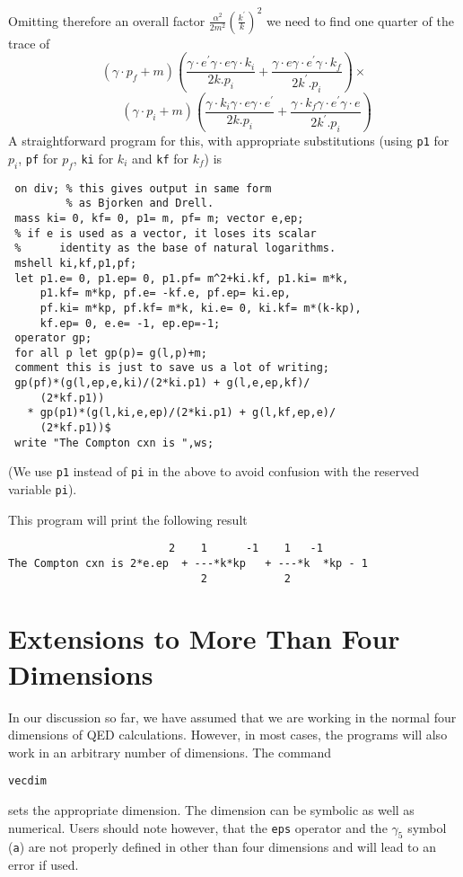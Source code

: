 Omitting therefore an overall factor
$\displaystyle\frac{\alpha^2}{2m^2}\left(\frac{k^\prime}{k}\right)^2$ we need to find one quarter of the trace of
\[
 \left( \gamma\cdot p_f + m\right)
 \left(\frac{\gamma\cdot e^\prime \gamma\cdot e\gamma\cdot k_i}{2k.p_i} +
  \frac{\gamma\cdot e\gamma\cdot e^\prime \gamma\cdot k_f}{2k^\prime.p_i}\right)\times
\]
\[
 \qquad\left(
  \gamma\cdot p_i + m\right)
 \left(\frac{\gamma\cdot k_i\gamma\cdot e\gamma\cdot e^\prime}{2k.p_i} +
  \frac{\gamma\cdot k_f\gamma\cdot e^\prime \gamma\cdot e}{2k^\prime.p_i}\right)
\]
A straightforward \REDUCE{} program for this, with appropriate substitutions
(using \texttt{p1} for $p_i$, \texttt{pf} for $p_f$, \texttt{ki}
for $k_i$ and \texttt{kf} for $k_f$) is
\begin{verbatim}
 on div; % this gives output in same form
         % as Bjorken and Drell.
 mass ki= 0, kf= 0, p1= m, pf= m; vector e,ep;
 % if e is used as a vector, it loses its scalar
 %      identity as the base of natural logarithms.
 mshell ki,kf,p1,pf;
 let p1.e= 0, p1.ep= 0, p1.pf= m^2+ki.kf, p1.ki= m*k,
     p1.kf= m*kp, pf.e= -kf.e, pf.ep= ki.ep,
     pf.ki= m*kp, pf.kf= m*k, ki.e= 0, ki.kf= m*(k-kp),
     kf.ep= 0, e.e= -1, ep.ep=-1;
 operator gp;
 for all p let gp(p)= g(l,p)+m;
 comment this is just to save us a lot of writing;
 gp(pf)*(g(l,ep,e,ki)/(2*ki.p1) + g(l,e,ep,kf)/
     (2*kf.p1))
   * gp(p1)*(g(l,ki,e,ep)/(2*ki.p1) + g(l,kf,ep,e)/
     (2*kf.p1))$
 write "The Compton cxn is ",ws;
\end{verbatim}

(We use \texttt{p1} instead of \texttt{pi} in the above to avoid confusion with
the reserved variable \texttt{pi}).

This program will print the following result
\begin{verbatim}
                         2    1      -1    1   -1
The Compton cxn is 2*e.ep  + ---*k*kp   + ---*k  *kp - 1
                              2            2
\end{verbatim}

\section{Extensions to More Than Four Dimensions}
\hypertarget{command:VECDIM}{}

In our discussion so far, we have assumed that we are working in the
normal four dimensions of QED calculations. However, in most cases, the
programs will also work in an arbitrary number of dimensions. The command
\begin{syntax}
  \texttt{vecdim }
\end{syntax}
sets the appropriate dimension. The dimension can be symbolic as well as
numerical. Users should note however, that the \texttt{eps} operator and the
$\gamma_{5}$ symbol (\texttt{a}) are not properly defined in other than four
dimensions and will lead to an error if used.

